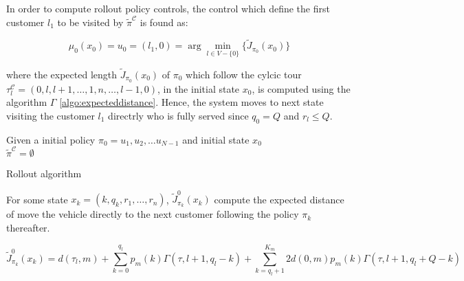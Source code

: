 

In order to compute rollout policy controls, the control which define the first customer $l_1$ to be visited by $\tilde{\pi}^\mathcal{C}$ is found as:

\[\mu_0(x_0) = u_0 = (l_1,0) = \arg\min\limits_{l \in V-\{0\}} \{\tilde{J}_{\pi_0}(x_0)\}\]

where the expected length $\tilde{J}_{\pi_0}(x_0)$ of ${\pi_0}$ which follow the cylcic tour $\tau^\mathcal{C}_l=(0,l,l+1,\ldots,1,n,\ldots,l-1,0)$, in the initial state $x_0$, is computed using the algorithm $\Gamma$ \ref{algo:expecteddistance}. Hence, the system moves to next state visiting the customer $l_1$ directrly who is fully served since $q_0 = Q$ and $r_l \leq Q$.


 
\begin{algorithm}
Given a initial policy $\pi_0=u_1,u_2,\ldots u_{N-1}$ and initial state $x_0$ \\
$\tilde{\pi}^\mathcal{C} = \emptyset$\\
\caption{Rollout algorithm}\label{algo:rollout}
\end{algorithm}


For some state $x_k = (k,q_k,r_1,\ldots,r_n)$, $\tilde{J}^0_{\pi_k}(x_k)$ compute the expected distance of move the vehicle directly to the next customer following the policy ${\pi_k}$ thereafter.

\begin{equation}\label{ra:Cost2Go0}%
 \tilde{J}^0_{\pi_k}(x_k)=d(\tau_l,m)+\sum_{k=0}^{q_l}p_m(k)\Gamma(\tau,l+1,q_l-k)+\sum_{k=q_l+1}^{K_m}2d(0,m)p_m(k)\Gamma(\tau,l+1,q_l+Q-k)%
\end{equation}

